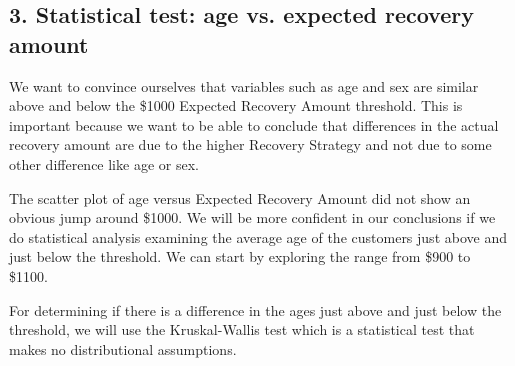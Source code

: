 \documentclass[11pt]{article}
\begin{document}
    \subsection{3. Statistical test: age vs. expected recovery
amount}\label{statistical-test-age-vs.-expected-recovery-amount}

We want to convince ourselves that variables such as age and sex are
similar above and below the \$1000 Expected Recovery Amount threshold.
This is important because we want to be able to conclude that
differences in the actual recovery amount are due to the higher Recovery
Strategy and not due to some other difference like age or sex.

The scatter plot of age versus Expected Recovery Amount did not show an
obvious jump around \$1000. We will be more confident in our conclusions
if we do statistical analysis examining the average age of the customers
just above and just below the threshold. We can start by exploring the
range from \$900 to \$1100.

For determining if there is a difference in the ages just above and just
below the threshold, we will use the Kruskal-Wallis test which is a
statistical test that makes no distributional assumptions.
\end{document}
